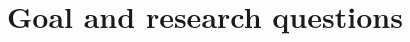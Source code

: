 \begin{comment}
The field of Neural Radiance Fields (NeRF) has experienced a surge in research and development over the past years, with models becoming exponentially better and more performant. These models have demonstrated impressive capabilities in efficiently reconstructing 3D scenes from 2D images, opening up new frontiers in many applications including autonomous driving. As an example, Wayve, a pioneer in the self-driving vehicle industry, has already integrated NeRF technology into their system (\textbf{Cite Nvidia GTC Talk}). As with most large-scale NeRF implementations with commercial applications, their tools and code remain proprietary, rendering them inaccessible for wider research purposes. However, this advancement underscores the potential significance of the technology and motivates further exploration of its capabilities and potential applications.

One particular area of interest is the ability to create a pipeline that captures data and reconstructs larger scenes, facilitating the application of NeRF models in large-scale environments. A functional pipeline could further enhance the performance of systems like Wayve's and lead to broader implications in other sectors requiring 3D scene reconstruction.

There are multiple key steps to achieving the goal of designing and developing an end-to-end pipeline that enables the capture and reconstruction of large 3D scenes. A pragmatic approach would first create a data capture pipeline in a controllable virtual environment, which in turn is connected to a NeRF pipeline. Having constructed the pipeline it could be used to create a baseline to compare future iterations of scene capture and NeRF-settings, allowing steady improvement. With a functional pipeline, and an acquired baseline, the pipeline could be extended to enable the input of real data.

Given the importance and potential of this research in the evolving landscape of 3D scene reconstruction, this thesis seeks to explore these steps and further contribute to the knowledge and application of NeRF technology.
\end{comment}









\section{Goal and research questions}

